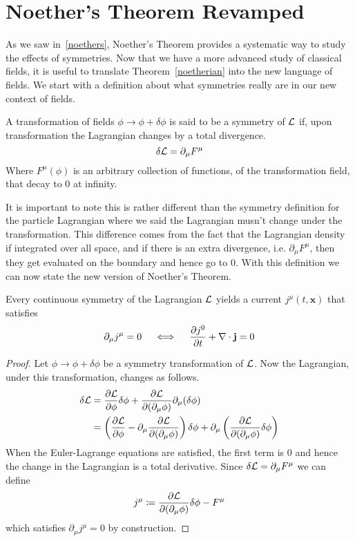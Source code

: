 \section{Noether's Theorem Revamped}\label{noether2}
As we saw in~\ref{noethers}, Noether's Theorem provides a systematic way to
study the effects of symmetries. Now that we have a more advanced study of
classical fields, it is useful to translate Theorem~\ref{noetherian} into the
new language of fields. We start with a definition about what symmetries really
are in our new context of fields.
\begin{definition}
    A transformation of fields \(\phi\to\phi + \delta\phi\) is said to be a
    symmetry of \(\mathcal{L}\) if, upon transformation the Lagrangian changes by a total
    divergence.
    \begin{equation}
        \delta\mathcal{L} = \partial_\mu F^\mu
    \end{equation}
    Where \(F^\mu(\phi)\) is an arbitrary collection of functions, of the
    transformation field, that decay to 0 at infinity.
\end{definition}
It is important to note this is rather different than the symmetry definition
for the particle Lagrangian where we said the Lagrangian musn't change under the
transformation. This difference comes from the fact that the Lagrangian density
if integrated over all space, and if there is an extra divergence, i.e.
\(\partial_\mu F^\mu\), then they get evaluated on the boundary and hence go to
0. With this definition we can now state the new version of Noether's Theorem.
\begin{theorem}\label{noetherfield}
    Every continuous symmetry of the Lagrangian \(\mathcal{L}\) yields a current \(j^\mu(t,\mathbf{x})\) that satisfies
    \begin{equation}\label{eq:conscurrent}
        \partial_\mu j^\mu = 0 \quad \iff \quad \pdv{j^0}{t} + \nabla\cdot\mathbf{j} = 0
    \end{equation}
\end{theorem}
\begin{proof}
    Let \(\phi\to\phi + \delta\phi\) be a symmetry transformation of \(\mathcal{L}\).
    Now the Lagrangian, under this transformation, changes as follows.
    \begin{align}
        \delta\mathcal{L} & = \pdv{\mathcal{L}}{\phi}\delta\phi + \pdv{\mathcal{L}}{(\partial_\mu\phi)}\partial_\mu(\delta\phi)                                                                      \\
                   & = \left(\pdv{\mathcal{L}}{\phi} - \partial_\mu\pdv{\mathcal{L}}{(\partial_\mu\phi)}\right)\delta\phi + \partial_\mu\left(\pdv{\mathcal{L}}{(\partial_\mu\phi)}\delta\phi\right)
    \end{align}
    When the Euler-Lagrange equations are satisfied, the first term is 0 and
    hence the change in the Lagrangian is a total derivative. Since
    \(\delta\mathcal{L} = \partial_\mu F^\mu\) we can define
    \begin{equation}
        j^\mu\coloneqq \pdv{\mathcal{L}}{(\partial_\mu\phi)}\delta\phi - F^\mu
    \end{equation}
    which satisfies \(\partial_\mu j^\mu = 0\) by construction.
\end{proof}
